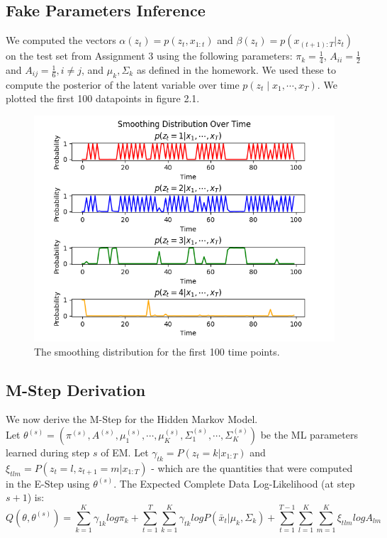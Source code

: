 \documentclass[paper=a4, fontsize=11pt]{scrartcl} %
\numberwithin{equation}{section} %
\numberwithin{figure}{section} %
\numberwithin{table}{section} %
\begin{document}
\subsection{Fake Parameters Inference}
We computed the vectors \(\alpha(z_t)=p(z_t,x_{1:t})\) and \(\beta(z_t)=p(x_{(t+1):T} | z_t)\) on the test set from Assignment 3 using the following parameters: \(\pi_k = \frac{1}{4}\), \(A_{ii}=\frac{1}{2}\) and \(A_{ij}=\frac{1}{6}, i\ne j\), and \(\mu_k, \Sigma_k\) as defined in the homework. 
We used these to compute the posterior of the latent variable over time \(p(z_t \mid x_1, \cdots, x_T)\). We plotted the first 100 datapoints in figure 2.1.

\begin{figure}
	\includegraphics[width=.9\linewidth]{smoothing_dist.png}
	\caption{The smoothing distribution for the first 100 time points.}
\end{figure}

\subsection{M-Step Derivation}
We now derive the M-Step for the Hidden Markov Model. \\
Let \(\theta^{(s)} = (\pi^{(s)}, A^{(s)}, \mu_1^{(s)}, \cdots, \mu_K^{(s)}, \Sigma_1^{(s)}, \cdots,\Sigma_K^{(s)})\) be the ML parameters learned during step \(s\) of EM. Let \(\gamma_{tk}=P(z_t=k|x_{1:T})\) and \(\xi_{tlm}=P(z_t=l,z_{t+1}=m|x_{1:T})\) - which are the quantities that were computed in the E-Step using \(\theta^{(s)}\).
The Expected Complete Data Log-Likelihood (at step \(s+1\)) is:
\begin{equation}
Q(\theta, \theta^{(s)}) = \sum_{k=1}^K \gamma_{1k}log\pi_k + \sum_{t=1}^T\sum_{k=1}^K \gamma_{tk}logP(\bar{x}_t|\mu_{k}, \Sigma_{k}) + \sum_{t=1}^{T-1} \sum_{l=1}^K\sum_{m=1}^K\xi_{tlm}logA_{lm}
\end{equation}
\end{document}
